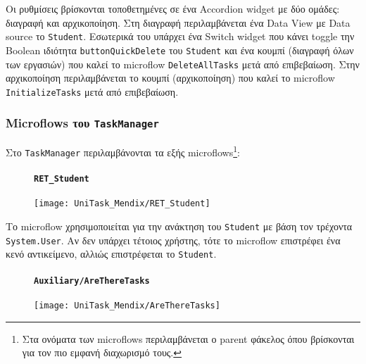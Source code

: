                 Οι ρυθμίσεις βρίσκονται τοποθετημένες σε ένα Accordion widget με δύο ομάδες: διαγραφή και αρχικοποίηση. Στη διαγραφή περιλαμβάνεται ένα Data View με Data source το \texttt{Student}. Εσωτερικά του υπάρχει ένα Switch widget που κάνει toggle την Boolean ιδιότητα \texttt{buttonQuickDelete} του \texttt{Student} και ένα κουμπί ({\Zona διαγραφή όλων των εργασιών}) που καλεί το microflow \texttt{DeleteAllTasks} μετά από επιβεβαίωση. Στην αρχικοποίηση περιλαμβάνεται το κουμπί ({\Zona αρχικοποίηση}) που καλεί το microflow \texttt{InitializeTasks} μετά από επιβεβαίωση.

            \subsubsection{Microflows του \texttt{TaskManager}}
                Στο \texttt{TaskManager} περιλαμβάνονται τα εξής microflows\footnote{Στα ονόματα των microflows περιλαμβάνεται ο parent φάκελος όπου βρίσκονται για τον πιο εμφανή διαχωρισμό τους.}:

                \begin{figure}[H] \noindent
                    \paragraph{\texttt{RET\_Student}}
                    \begin{center}
                        \texttt{[image: UniTask\_Mendix/RET\_Student]}
                    \end{center}
                \end{figure}

                Το microflow χρησιμοποιείται για την ανάκτηση του \texttt{Student} με βάση τον τρέχοντα \texttt{System.User}. Αν δεν υπάρχει τέτοιος χρήστης, τότε το microflow επιστρέφει ένα κενό αντικείμενο, αλλιώς επιστρέφεται το \texttt{Student}.

                \begin{figure}[H] \noindent
                    \paragraph{\texttt{Auxiliary/AreThereTasks}}
                    \begin{center}
                        \texttt{[image: UniTask\_Mendix/AreThereTasks]}
                    \end{center}
                \end{figure}

